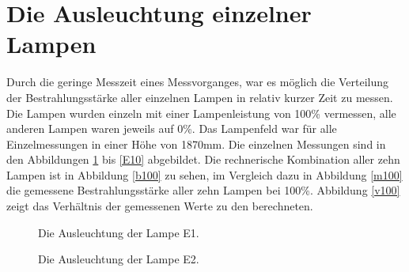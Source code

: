 \documentclass[a4paper,bibtotoc,oneside]{scrbook}
\begin{document}
\FloatBarrier


\section{Die Ausleuchtung einzelner Lampen}

Durch die geringe Messzeit eines Messvorganges, war es möglich die Verteilung der Bestrahlungsstärke aller einzelnen Lampen in relativ kurzer Zeit zu messen. Die Lampen wurden einzeln mit einer Lampenleistung von 100\% vermessen, alle anderen Lampen waren jeweils auf 0\%. Das Lampenfeld war für alle Einzelmessungen in einer Höhe von 1870mm.
Die einzelnen Messungen sind in den Abbildungen \ref{E1} bis \ref{E10} abgebildet.
Die rechnerische Kombination aller zehn Lampen ist in Abbildung \ref{b100} zu sehen, im Vergleich dazu in Abbildung \ref{m100} die gemessene Bestrahlungsstärke aller zehn Lampen bei 100\%.
Abbildung \ref{v100} zeigt das Verhältnis der gemessenen Werte zu den berechneten.

\begin{figure} [htbp]
\caption{Die Ausleuchtung der Lampe E1.}
\label{E1}
\end{figure} 

\begin{figure} [htbp]
\caption{Die Ausleuchtung der Lampe E2.}
\label{E2}
\end{figure} 
\end{document}
